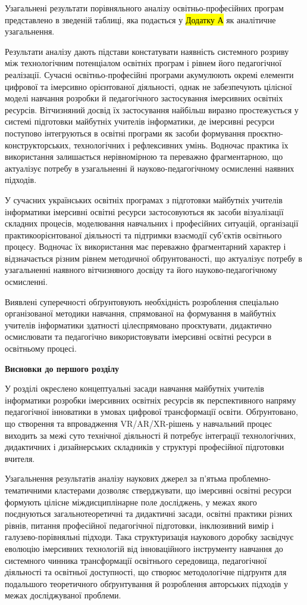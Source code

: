 Узагальнені результати порівняльного аналізу освітньо-професійних програм представлено в зведеній таблиці, яка подається у \hl{Додатку А} як аналітичне узагальнення.

Результати аналізу дають підстави констатувати наявність системного розриву між технологічним потенціалом освітніх програм і рівнем його педагогічної реалізації. Сучасні освітньо-професійні програми акумулюють окремі елементи цифрової та імерсивно орієнтованої діяльності, однак не забезпечують цілісної моделі навчання розробки й педагогічного застосування імерсивних освітніх ресурсів. Вітчизняний досвід їх застосування найбільш виразно простежується у системі підготовки майбутніх учителів інформатики, де імерсивні ресурси поступово інтегруються в освітні програми як засоби формування проєктно-конструкторських, технологічних і рефлексивних умінь. Водночас практика їх використання залишається нерівномірною та переважно фрагментарною, що актуалізує потребу в узагальненні й науково-педагогічному осмисленні наявних підходів.

У сучасних українських освітніх програмах з підготовки майбутніх учителів інформатики імерсивні освітні ресурси застосовуються як засоби візуалізації складних процесів, моделювання навчальних і професійних ситуацій, організації практикоорієнтованої діяльності та підтримки взаємодії суб'єктів освітнього процесу. Водночас їх використання має переважно фрагментарний характер і відзначається різним рівнем методичної обґрунтованості, що актуалізує потребу в узагальненні наявного вітчизняного досвіду та його науково-педагогічному осмисленні.

Виявлені суперечності обґрунтовують необхідність розроблення спеціально організованої методики навчання, спрямованої на формування в майбутніх учителів інформатики здатності цілеспрямовано проєктувати, дидактично осмислювати та педагогічно використовувати імерсивні освітні ресурси в освітньому процесі.

\textbf{Висновки до першого розділу}

У розділі окреслено концептуальні засади навчання майбутніх учителів інформатики розробки імерсивних освітніх ресурсів як перспективного напряму педагогічної інноватики в умовах цифрової трансформації освіти. Обґрунтовано, що створення та впровадження VR/AR/XR-рішень у навчальний процес виходить за межі суто технічної діяльності й потребує інтеграції технологічних, дидактичних і дизайнерських складників у структурі професійної підготовки вчителя.

Узагальнення результатів аналізу наукових джерел за п'ятьма проблемно-тематичними кластерами дозволяє стверджувати, що імерсивні освітні ресурси формують цілісне міждисциплінарне поле досліджень, у межах якого поєднуються загальнотеоретичні та дидактичні засади, освітні практики різних рівнів, питання професійної педагогічної підготовки, інклюзивний вимір і галузево-порівняльні підходи. Така структуризація наукового доробку засвідчує еволюцію імерсивних технологій від інноваційного інструменту навчання до системного чинника трансформації освітнього середовища, педагогічної діяльності та освітньої доступності, що створює методологічне підґрунтя для подальшого теоретичного обґрунтування й розроблення авторських підходів у межах досліджуваної проблеми.

